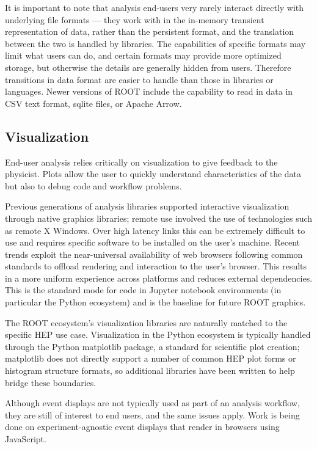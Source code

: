 It is important to note that analysis end-users very rarely interact directly with underlying file formats --- they work with in the in-memory transient representation of data, rather than the persistent format, and the translation between the two is handled by libraries. The capabilities of specific formats may limit what users can do, and certain formats may provide more optimized storage, but otherwise the details are generally hidden from users. Therefore transitions in data format are easier to handle than those in libraries or languages. Newer versions of ROOT include the capability to read in data in CSV text format, sqlite files, or Apache Arrow.

\subsection{Visualization}

End-user analysis relies critically on visualization to give feedback to the physicist. Plots allow the user to quickly understand characteristics of the data but also to debug code and workflow problems.

Previous generations of analysis libraries supported interactive visualization through native graphics libraries; remote use involved the use of technologies such as remote X Windows. Over high latency links this can be extremely difficult to use and requires specific software to be installed on the user's machine. Recent trends exploit the near-universal availability of web browsers following common standards to offload rendering and interaction to the user's browser. This results in a more uniform experience across platforms and reduces external dependencies. This is the standard mode for code in Jupyter notebook environments (in particular the Python ecosystem) and is the baseline for future ROOT graphics.

The ROOT ecosystem's visualization libraries are naturally matched to the specific HEP use case. Visualization in the Python ecosystem is typically handled through the Python matplotlib package, a standard for scientific plot creation; matplotlib does not directly support a number of common HEP plot forms or histogram structure formats, so additional libraries have been written to help bridge these boundaries.

Although event displays are not typically used as part of an analysis workflow, they are still of interest to end users, and the same issues apply. Work is being done on experiment-agnostic event displays that render in browsers using JavaScript.

